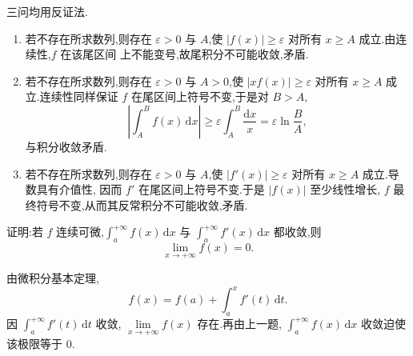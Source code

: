 \begin{solution}
  三问均用反证法.
  \begin{enumerate}
    \item 若不存在所求数列,则存在 $\varepsilon>0$ 与 $A$,使
          $|f(x)|\geq\varepsilon$ 对所有 $x\geq A$ 成立.由连续性,$f$ 在该尾区间
          上不能变号,故尾积分不可能收敛,矛盾.

    \item 若不存在所求数列,则存在 $\varepsilon>0$ 与 $A>0$,使
          $|xf(x)|\geq\varepsilon$ 对所有 $x\geq A$ 成立.连续性同样保证 $f$
          在尾区间上符号不变,于是对 $B>A$,
          \[
            \left|\int_A^Bf(x)\,\mathrm{d}x\right|
            \geq\varepsilon\int_A^B\dfrac{\mathrm{d}x}{x}
            =\varepsilon\ln\dfrac{B}{A},
          \]
          与积分收敛矛盾.

    \item 若不存在所求数列,则存在 $\varepsilon>0$ 与 $A$,使
          $|f'(x)|\geq\varepsilon$ 对所有 $x\geq A$ 成立.导数具有介值性,
          因而 $f'$ 在尾区间上符号不变.于是 $|f(x)|$ 至少线性增长,
          $f$ 最终符号不变,从而其反常积分不可能收敛,矛盾.
  \end{enumerate}
\end{solution}

\begin{example}
  证明:若 $f$ 连续可微,$\displaystyle\int_a^{+\infty}f(x)\,\mathrm{d}x$ 与 $\displaystyle\int_a^{+\infty}f'(x)\,\mathrm{d}x$ 都收敛,则
  \[
    \displaystyle\lim\limits_{x\to+\infty}f(x)=0.
  \]
\end{example}
\exampleblank

\begin{solution}
  由微积分基本定理,
  \[
    f(x)=f(a)+\int_a^xf'(t)\,\mathrm{d}t.
  \]
  因 $\displaystyle\int_a^{+\infty}f'(t)\,\mathrm{d}t$ 收敛,
  $\displaystyle\lim\limits_{x\to+\infty}f(x)$ 存在.再由上一题,
  $\displaystyle\int_a^{+\infty}f(x)\,\mathrm{d}x$ 收敛迫使该极限等于 $0$.
\end{solution}
